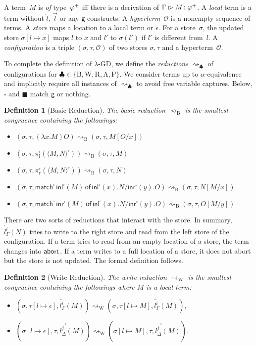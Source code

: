\documentclass[doctor]{iscs-thesis}
\newtheorem{definition}{Definition}
\newcommand{\hypert}{\mathcal{O}}
\newcommand{\tr}{\vartriangleright}
\newcommand{\reduce}{\rightsquigarrow}
\newcommand{\g} [0]{\mathsf{g}}
\newcommand{\spair} [1]{\langle{#1}\rangle^{\square}}
\newcommand{\sinl}[1]{\mathsf{inl}^{\square}\left({#1}\right)}
\newcommand{\sinr}[1]{\mathsf{inr}^{\square}\left({#1}\right)}
\newcommand{\spil}[1]{\pi^{\square}_{\mathrm l}\left({#1}\right)}
\newcommand{\spir}[1]{\pi^{\square}_{\mathrm r}\left({#1}\right)}
\newcommand{\smat}[5]{\mathsf{match}^{\square}\,{#1}\,\mathsf{of}\, \sinl{#2}. {#3}/
\sinr{#4}. {#5}}
\newcommand{\ltor}[4]{\overrightarrow{{#2}^{#1}_{#3}} \left({#4}\right)}
\newcommand{\rtol}[4]{\overleftarrow{{#2}^{#1}_{#3}} \left({#4}\right)}
\newcommand{\abort}{\mathsf{abort\,}}
\newcommand{\tj}   [2]{ {#1} \colon{#2} }
\newcommand{\lgd}{$\lambda$-GD}
\newcommand{\lstore}{{\sigma}}
\newcommand{\rstore}{{\tau}}
\newcommand{\conf}[3]{(\lstore{#1},\rstore{#2},{#3})}
\newcommand{\breduce}{\reduce_{\mathrm B}}
\newcommand{\wreduce}{\reduce_{\mathrm W}}
\begin{document}
A term~$M$ is \textit{of} type~${\varphi}^+$ iff there is a derivation of
$\Gamma\tr
\tj{M}{\m\varphi}$.
A \textit{local} term is a term without $\overleftarrow l$,
$\overrightarrow l$ or any $\g$ constructs.
A \textit{hyperterm}~$\hypert$ is a nonempty sequence of terms.
A \textit{store} maps a location to a
local term or $\epsilon$.
For a store~$\sigma$, the updated store $\sigma[l\mapsto x]$ maps $l$ to
$x$ and $l'$ to $\sigma(l')$ if $l'$ is different from~$l$.
A \textit{configuration} is a triple $\conf{}{}\hypert$ of two
stores $\lstore, \rstore$ and a hyperterm~$\hypert$.

To complete the definition of \lgd,
 we define the \textit{reductions} $\reduce_\clubsuit$ of
 configurations for $\clubsuit\in\{\mathrm B, \mathrm W, \mathrm R, \mathrm A,
 \mathrm P\}$.
 We consider terms up to $\alpha$-equivalence and implicitly
 require all instances
 of $\rightsquigarrow_\clubsuit$ to avoid free variable captures.
 Below, $\square$ and $\blacksquare$ match $\g$ or nothing.

\begin{definition}[Basic Reduction]
 The basic reduction $\breduce$ is the smallest congruence containing
 the followings:
 \begin{itemize}
  \item  $\conf{}{}{(\lambda x.M)O}\breduce
 \conf{}{}{M[O/x]}$
  \item $\conf{}{}{\spil{\spair{M,N}}} \breduce
	 \conf{}{}{           M   }$
  \item $\conf{}{}{\spir{\spair{M,N}}} \breduce
	 \conf{}{}{             N }$
  \item $\conf{}{}{\smat{\sinl M}x N y O} \breduce
	 \conf{}{}{              N[M/x]}$
  \item $\conf{}{}{\smat{\sinr M}x N y O} \breduce
	 \conf{}{}{                  O[M/y]}$
 \end{itemize}
\end{definition}

There are two sorts of reductions that interact with the store.
In summary, $\rtol i l \Gamma N$ tries to write to the right store and read from
the left store of the configuration.
If a term tries to read from an empty location of a store,
the term changes into $\abort$.  If a term writes to a full location of
a store, it does not abort but the store is not updated.
The formal definition follows.
\begin{definition}[Write Reduction]
 The write reduction $\wreduce$ is the smallest congruence
 containing the followings where $M$ is a local term:
 \begin{itemize}
  \item $\conf{}{[l\mapsto\epsilon]}{\rtol i l \Gamma M}
	\wreduce
	\conf{}{[l\mapsto M]}{\rtol i l \Gamma M}
	$\enspace,
  \item $\conf{[l\mapsto\epsilon]}{}{\ltor j l \Delta M}
	\wreduce
	\conf{[l\mapsto M]}{}{\ltor j l \Delta M}
	$\enspace.
 \end{itemize}
\end{definition}
\end{document}
